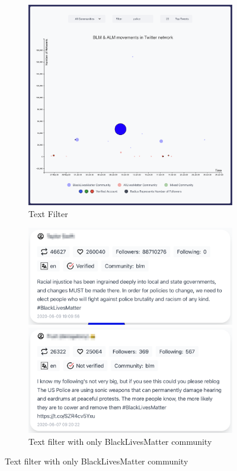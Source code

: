 \begin{figure}[H]
\begin{subfigure}{.45\textwidth}
  \centering
  \captionsetup{justification=centering}
  \includegraphics[width=1\linewidth]{./pics/obserp.png}  
 
  \caption{Text Filter}
  \label{fig:sub-first-tfilter}
\end{subfigure}
\begin{subfigure}{.45\textwidth}
  \centering
  \captionsetup{justification=centering}
  \includegraphics[width=0.9\linewidth]{./pics/obserpb1.png}
  
  \includegraphics[width=0.9\linewidth]{./pics/obserpb2.png}
  \caption{Text filter with only BlackLivesMatter community}
  \label{fig:sub-second-tfoblmc}
\end{subfigure}


\end{figure}

